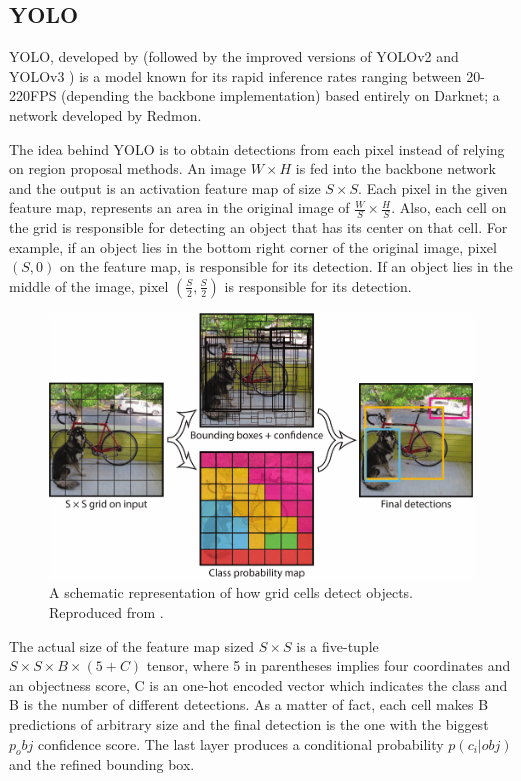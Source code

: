  \subsection{YOLO}
 YOLO, developed by \cite{redmon2016you} (followed by the improved versions of YOLOv2 \cite{redmon2017yolo9000} and YOLOv3 \cite{redmon2018yolov3}) is a model known for its rapid inference 
 rates ranging between 20-220FPS (depending the backbone implementation) based entirely on Darknet; a network developed by Redmon.
 
 The idea behind YOLO is to obtain detections from each pixel instead of relying on region proposal methods. An image $W\times H$ is fed into the backbone network and the output is an activation feature map of size $S\times S$. Each pixel in the given feature map, represents an area in the original image of $\frac{W}{S} \times \frac{H}{S}$. Also, each cell on the grid is responsible for detecting an object that has its center on that cell. For example, if an object lies in the bottom right corner of the original image, pixel $(S,0)$ on the feature map, is responsible for its detection. If an object lies in the middle of the image, pixel $(\frac{S}{2},\frac{S}{2})$ is responsible for its detection. 
 
\begin{figure}[!htb]
  \centering
  \includegraphics[width=12cm]{../figures/ch2/fig5.png}
  \caption{A schematic representation of how grid cells detect objects. Reproduced from \cite{redmon2016you}.}
  \label{fig5}
\end{figure} 
 
The actual size of the feature map sized $S\times S$ is a five-tuple $S\times S \times B\times(5+C)$ tensor, where 5 in parentheses implies four coordinates and an objectness score, C is an one-hot encoded vector which indicates the class and B is the number of different detections. As a matter of fact, each cell makes B predictions of arbitrary size and the final detection is the one with the biggest $p_obj$ confidence score. The last layer produces a conditional probability $p(c_i|obj)$ and the refined bounding box.


